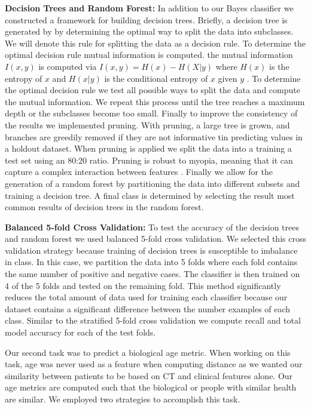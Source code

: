 \documentclass{article}
\begin{document}
\textbf{Decision Trees and Random Forest:}  In addition to our Bayes classifier we constructed a framework for building decision trees. Briefly, a decision tree is generated by by determining the optimal way to split the data into subclasses. We will denote this rule for splitting the data as a decision rule. To determine the optimal decision rule mutual information is computed. the mutual information $I(x, y)$ is computed via $I(x, y) = H(x) - H(X | y)$  where $H(x)$ is the entropy of $x$ and $H(x | y)$ is the conditional entropy of $x$ given $y$ \cite{quinlanInductionDecisionTrees1986}. To determine the optimal decision rule we test all possible ways to split the data and compute the mutual information. We repeat this process until the tree reaches a maximum depth or the subclasses become too small. Finally to improve the consistency of the results we implemented pruning. With pruning, a large tree is grown, and branches are greedily removed if they are not informative tin predicting values in a holdout dataset. When pruning is applied we split the data into a training a test set using an 80:20 ratio. Pruning is robust to myopia, meaning that it can capture a complex interaction between features \cite{nortonGeneratingBetterDecision1989}. Finally we allow for the generation of a random forest by partitioning the data into different subsets and training a decision tree. A final class is determined by selecting the result most common results of decision trees in the random forest. 

\textbf{Balanced 5-fold Cross Validation:} To test the accuracy of the decision trees and random forest we used balanced 5-fold cross validation. We selected this cross validation strategy because training of decision trees is susceptible to imbalance in class. In this case, we partition the data into 5 folds where each fold contains the same number of positive and negative cases. The classifier is then trained on 4 of the 5 folds and tested on the remaining fold. This method significantly reduces the total amount of data used for training each classifier because our dataset contains a significant difference between the number examples of each class. Similar to the stratified 5-fold cross validation we compute recall and total model accuracy for each of the test folds.  

Our second task was to predict a biological age metric. When working on this task, age was never used as a feature when computing distance as we wanted our similarity between patients to be based on CT and clinical features alone. Our age metrics are computed such that the biological or people with similar health are similar. We employed two strategies to accomplish this task. 
\end{document}
